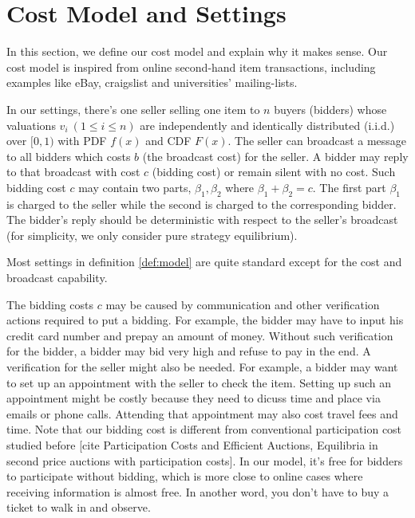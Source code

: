 \section{Cost Model and Settings}

In this section, we define our cost model and explain why it makes sense. Our
cost model is inspired from online second-hand item transactions, including
examples like eBay, craigslist and universities' mailing-lists.


\begin{definition}\label{def:model}

In our settings, there's one seller selling one item to $n$ buyers (bidders)
whose valuations $v_i~(1 \leq i \leq n)$ are independently and identically
distributed (i.i.d.) over $[0, 1)$ with PDF $f(x)$ and CDF $F(x)$. The seller
can broadcast a message to all bidders which costs $b$ (the broadcast cost) for
the seller.  A bidder may reply to that broadcast with cost $c$ (bidding cost)
or remain silent with no cost. Such bidding cost $c$ may contain two parts,
$\beta_1, \beta_2$ where $\beta_1+\beta_2 = c$.  The first part $\beta_1$ is
charged to the seller while the second is charged to the corresponding bidder.
The bidder's reply should be deterministic with respect to the seller's
broadcast (for simplicity, we only consider pure strategy equilibrium).

\end{definition}

Most settings in definition \ref{def:model} are quite standard except for the
cost and broadcast capability.

The bidding costs $c$ may be caused by communication and other verification
actions required to put a bidding. For example, the bidder may have to input
his credit card number and prepay an amount of money. Without such verification
for the bidder, a bidder may bid very high and refuse to pay in the end. A
verification for the seller might also be needed. For example, a bidder may
want to set up an appointment with the seller to check the item.  Setting up
such an appointment might be costly because they need to dicuss time and place
via emails or phone calls.  Attending that appointment may also cost travel
fees and time.  Note that our bidding cost is different from conventional
participation cost studied before [cite Participation Costs and Efficient
Auctions, Equilibria in second price auctions with participation costs]. In our
model, it's free for bidders to participate without bidding, which is more
close to online cases where receiving information is almost free.  In another
word, you don't have to buy a ticket to walk in and observe.

